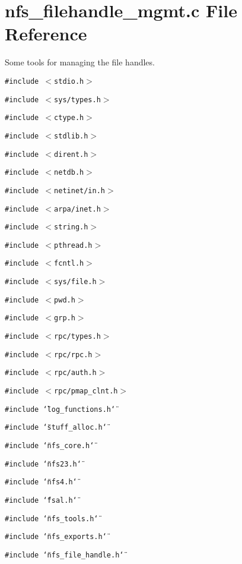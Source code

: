 \section{nfs\_\-filehandle\_\-mgmt.c File Reference}
\label{nfs__filehandle__mgmt_8c}
Some tools for managing the file handles. 

{\tt \#include $<$stdio.h$>$}\par
{\tt \#include $<$sys/types.h$>$}\par
{\tt \#include $<$ctype.h$>$}\par
{\tt \#include $<$stdlib.h$>$}\par
{\tt \#include $<$dirent.h$>$}\par
{\tt \#include $<$netdb.h$>$}\par
{\tt \#include $<$netinet/in.h$>$}\par
{\tt \#include $<$arpa/inet.h$>$}\par
{\tt \#include $<$string.h$>$}\par
{\tt \#include $<$pthread.h$>$}\par
{\tt \#include $<$fcntl.h$>$}\par
{\tt \#include $<$sys/file.h$>$}\par
{\tt \#include $<$pwd.h$>$}\par
{\tt \#include $<$grp.h$>$}\par
{\tt \#include $<$rpc/types.h$>$}\par
{\tt \#include $<$rpc/rpc.h$>$}\par
{\tt \#include $<$rpc/auth.h$>$}\par
{\tt \#include $<$rpc/pmap\_\-clnt.h$>$}\par
{\tt \#include \char`\"{}log\_\-functions.h\char`\"{}}\par
{\tt \#include \char`\"{}stuff\_\-alloc.h\char`\"{}}\par
{\tt \#include \char`\"{}nfs\_\-core.h\char`\"{}}\par
{\tt \#include \char`\"{}nfs23.h\char`\"{}}\par
{\tt \#include \char`\"{}nfs4.h\char`\"{}}\par
{\tt \#include \char`\"{}fsal.h\char`\"{}}\par
{\tt \#include \char`\"{}nfs\_\-tools.h\char`\"{}}\par
{\tt \#include \char`\"{}nfs\_\-exports.h\char`\"{}}\par
{\tt \#include \char`\"{}nfs\_\-file\_\-handle.h\char`\"{}}\par
